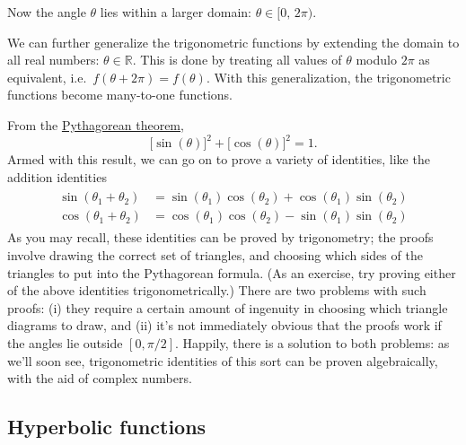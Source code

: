 \documentclass[10pt,a4paper]{article}
\begin{document}
\noindent
Now the angle $\theta$ lies within a larger domain: $\theta \in
[0,\,2\pi)$.

We can further generalize the trigonometric functions by extending the
domain to all real numbers: $\theta \in \mathbb{R}$. This is done by
treating all values of $\theta$ modulo $2\pi$ as equivalent,
i.e.~$f(\theta + 2\pi) = f(\theta)$. With this generalization, the
trigonometric functions become many-to-one functions.


From the
\href{http://en.wikipedia.org/wiki/Pythagoras_theorem}{Pythagorean
  theorem},
\begin{equation}
\big[\sin(\theta)\big]^2 + \big[\cos(\theta)\big]^2 = 1.
\end{equation}
Armed with this result, we can go on to prove a variety of identities,
like the addition identities
\begin{align}
  \begin{aligned}
    \sin(\theta_1 + \theta_2) &= \sin(\theta_1) \cos(\theta_2) + \cos(\theta_1)\sin(\theta_2) \\\cos(\theta_1 + \theta_2) &= \cos(\theta_1) \cos(\theta_2) - \sin(\theta_1)\sin(\theta_2)\end{aligned}
\end{align}
As you may recall, these identities can be proved by trigonometry; the
proofs involve drawing the correct set of triangles, and choosing
which sides of the triangles to put into the Pythagorean formula.  (As
an exercise, try proving either of the above identities
trigonometrically.) There are two problems with such proofs: (i) they
require a certain amount of ingenuity in choosing which triangle
diagrams to draw, and (ii) it's not immediately obvious that the
proofs work if the angles lie outside $[0,\pi/2]$. Happily, there is a
solution to both problems: as we'll soon see, trigonometric identities
of this sort can be proven algebraically, with the aid of complex
numbers.

\subsection{Hyperbolic functions}\label{hyperbolic-functions}
\end{document}
